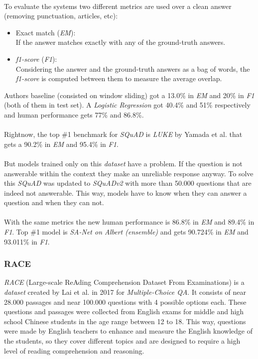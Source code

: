 \paragraph{}
To evaluate the systems two different metrics are used over a clean answer (removing punctuation, articles, etc):
\begin{itemize}
	\item Exact match (\emph{EM}): \\
		If the answer matches exactly with any of the ground-truth answers.
	\item \emph{f1-score} (\emph{F1}): \\
		Considering the answer and the ground-truth answers as a bag of words, the \emph{f1-score} is computed between them to measure the average overlap.
\end{itemize}
Authors baseline\cite{Rajpurkar2016} (consisted on window sliding) got a 13.0\% in \emph{EM} and 20\% in \emph{F1} (both of them in test set). A \emph{Logistic Regression} got 40.4\% and 51\% respectively and human performance gets 77\% and 86.8\%.
\paragraph{}
Rightnow, the top \#1 benchmark for \emph{SQuAD} is \emph{LUKE}\cite{Yamada2020} by Yamada et al. that gets a 90.2\% in \emph{EM} and 95.4\% in \emph{F1}.
\paragraph{}
But models trained only on this \emph{dataset} have a problem. If the question is not answerable within the context they make an unreliable response anyway. To solve this \emph{SQuAD} was updated to \emph{SQuADv2}\cite{Rajpurkar2018} with more than 50.000 questions that are indeed not answerable. This way, models have to know when they can answer a question and when they can not.
\paragraph{}
With the same metrics the new human performance is 86.8\% in \emph{EM} and 89.4\% in \emph{F1}. Top \#1 model is \emph{SA-Net on Albert (ensemble)} and gets 90.724\% in \emph{EM} and 93.011\% in \emph{F1}.
\subsubsection{RACE}
\label{sec:race}
\emph{RACE} (Large-scale ReAding Comprehension Dataset From Examinations)\cite{Lai2017} is a \emph{dataset} created by Lai et al. in 2017 for \emph{Multiple-Choice QA}. It consists of near 28.000 passages and near 100.000 questions with 4 possible options each. These questions and passages were collected from English exams for middle and high school Chinese students in the age range between 12 to 18. This way, questions were made by English teachers to enhance and measure the English knowledge of the students, so they cover different topics and are designed to require a high level of reading comprehension and reasoning. 
